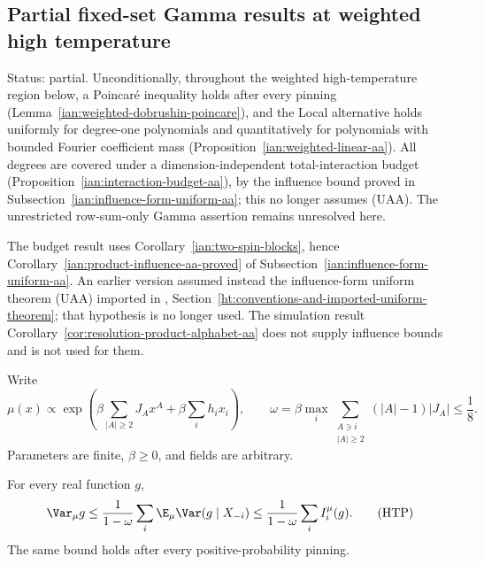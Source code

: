 \subsection{Partial fixed-set Gamma results at weighted high temperature}
\label{ian:gamma-set-high-temperature}

Status: partial. Unconditionally, throughout the weighted
high-temperature region below, a Poincar\'e inequality holds after
every pinning (Lemma~\ref{ian:weighted-dobrushin-poincare}), and the
Local alternative holds uniformly for degree-one polynomials and
quantitatively for polynomials with bounded Fourier coefficient mass
(Proposition~\ref{ian:weighted-linear-aa}). All degrees are covered
under a dimension-independent total-interaction budget
(Proposition~\ref{ian:interaction-budget-aa}), by the influence bound
proved in Subsection~\ref{ian:influence-form-uniform-aa}; this no longer
assumes (UAA). The unrestricted row-sum-only Gamma assertion remains
unresolved here.

The budget result uses Corollary~\ref{ian:two-spin-blocks}, hence Corollary~\ref{ian:product-influence-aa-proved} of Subsection~\ref{ian:influence-form-uniform-aa}. An earlier version assumed instead the influence-form uniform theorem (UAA) imported in , Section~\ref{ht:conventions-and-imported-uniform-theorem}; that hypothesis is no longer used. The simulation result Corollary~\ref{cor:resolution-product-alphabet-aa} does not supply influence bounds and is not used for them.

Write
\[
 \mu(x)\propto
 \exp\left(\beta\sum_{|A|\ge2}J_Ax^A+\beta\sum_i h_ix_i\right),
 \qquad
 \omega=\beta\max_i\sum_{\substack{A\ni i\\|A|\ge2}}
                  (|A|-1)|J_A|\le\frac18.
\]
Parameters are finite, \(\beta\ge0\), and fields are arbitrary.

\begin{lemma}
\label{ian:weighted-dobrushin-poincare}
For every real function \(g\),
\[
 \Var_\mu g
 \le\frac1{1-\omega}
       \sum_i\E_\mu\Var(g\mid X_{-i})
 \le\frac1{1-\omega}\sum_iI_i^\mu(g).
 \tag{HTP}
\]
The same bound holds after every positive-probability pinning.
\end{lemma}

